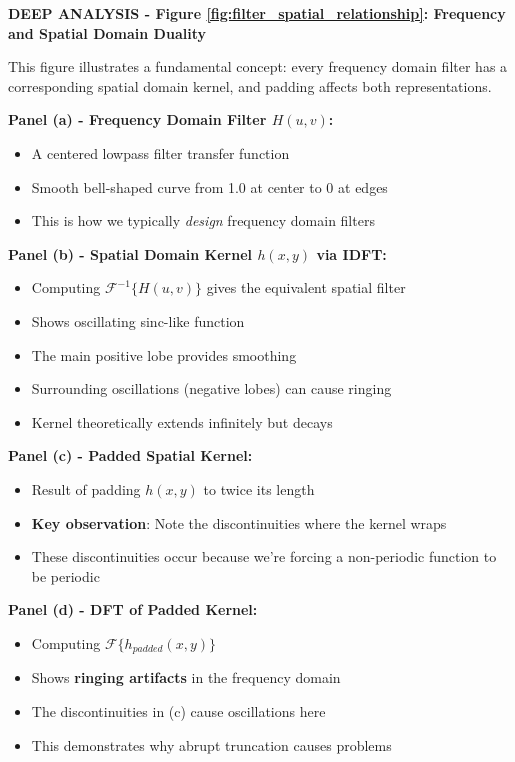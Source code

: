 \documentclass[12pt,a4paper]{article}
\begin{document}
\begin{deepexplanation}
\textbf{DEEP ANALYSIS - Figure \ref{fig:filter_spatial_relationship}: Frequency and Spatial Domain Duality}

This figure illustrates a fundamental concept: every frequency domain filter has a corresponding spatial domain kernel, and padding affects both representations.

\textbf{Panel (a) - Frequency Domain Filter $H(u,v)$:}
\begin{itemize}
    \item A centered lowpass filter transfer function
    \item Smooth bell-shaped curve from 1.0 at center to 0 at edges
    \item This is how we typically \textit{design} frequency domain filters
\end{itemize}

\textbf{Panel (b) - Spatial Domain Kernel $h(x,y)$ via IDFT:}
\begin{itemize}
    \item Computing $\mathcal{F}^{-1}\{H(u,v)\}$ gives the equivalent spatial filter
    \item Shows oscillating sinc-like function
    \item The main positive lobe provides smoothing
    \item Surrounding oscillations (negative lobes) can cause ringing
    \item Kernel theoretically extends infinitely but decays
\end{itemize}

\textbf{Panel (c) - Padded Spatial Kernel:}
\begin{itemize}
    \item Result of padding $h(x,y)$ to twice its length
    \item \textbf{Key observation}: Note the discontinuities where the kernel wraps
    \item These discontinuities occur because we're forcing a non-periodic function to be periodic
\end{itemize}

\textbf{Panel (d) - DFT of Padded Kernel:}
\begin{itemize}
    \item Computing $\mathcal{F}\{h_{padded}(x,y)\}$
    \item Shows \textbf{ringing artifacts} in the frequency domain
    \item The discontinuities in (c) cause oscillations here
    \item This demonstrates why abrupt truncation causes problems
\end{itemize}


\end{deepexplanation}
\end{document}
